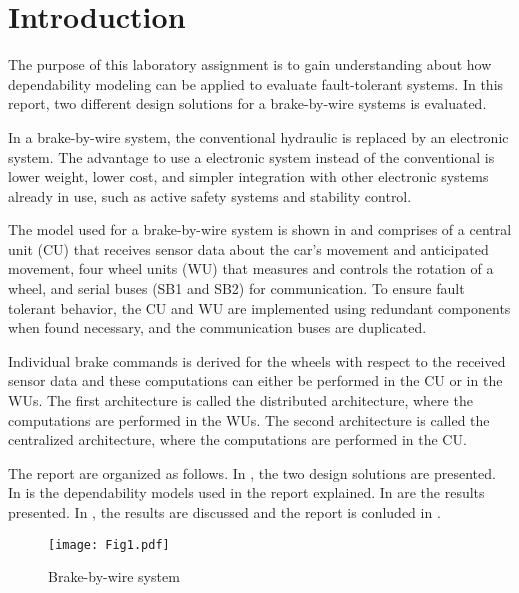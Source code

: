 \newpage
\section{Introduction}

The purpose of this laboratory assignment is to gain understanding about how dependability modeling can be applied to evaluate fault-tolerant systems. In this report, two different design solutions for a brake-by-wire systems is evaluated.
 
In a brake-by-wire system, the conventional hydraulic is replaced by an electronic system. The advantage to use a electronic system instead of the conventional is lower weight, lower cost, and simpler integration with other electronic systems already in use, such as active safety systems and stability control. 


The model used for a brake-by-wire system is shown in  and comprises of a central unit (CU) that receives sensor data about the car's movement and anticipated movement, four wheel units (WU) that measures and controls the rotation of a wheel, and serial buses (SB1 and SB2) for communication. To ensure fault tolerant behavior, the CU and WU are implemented using redundant components when found necessary, and the communication buses are duplicated. 

Individual brake commands is derived for the wheels with respect to the received sensor data and these computations can either be performed in the CU or in the WUs. The first architecture is called the distributed architecture, where the computations are performed in the WUs. The second architecture is called the centralized architecture, where the computations are performed in the CU.

The report are organized as follows. In , the two design solutions are presented. In  is the dependability models used in the report explained. In  are the results presented. In , the results are discussed and the report is conluded in .

\begin{figure}[h!]
  \centering
  \texttt{[image: Fig1.pdf]}
  \caption{Brake-by-wire system}
  \label{bbwsys}
\end{figure}